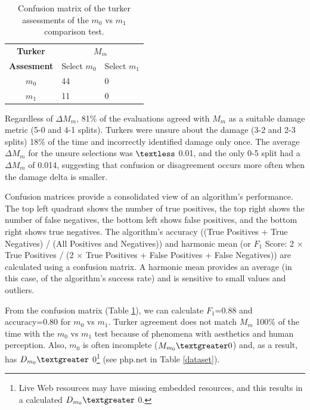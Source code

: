 \begin{table}
\centering\begin{tabular}{cll}
\textbf{Turker} & \multicolumn{2}{c}{ \textbf{ $M_{m}$}}                           \\
\textbf{Assesment}                  &          Select $m_{0}$             &           Select $m_{1}$             \\ \cline{2-3} 
       $m_{0}$           & \multicolumn{1}{|l}{44} & \multicolumn{1}{|l|}{0} \\ \cline{2-3} 
       $m_{1}$           & \multicolumn{1}{|l}{11} & \multicolumn{1}{|l|}{0} \\ \cline{2-3} 
\end{tabular}
 \caption{Confusion matrix of the turker assessments of the $m_0$ vs $m_1$ comparison test.}
  \label{m0cm}
\end{table}


Regardless of {$\Delta M_m$}, 81\% of the evaluations agreed with $M_m$ as a suitable damage metric (5-0 and 4-1 splits). Turkers were unsure about the damage (3-2 and 2-3 splits) 18\% of the time and incorrectly identified damage only once. The average {$\Delta M_m$} for the unsure selections was $\textless$ 0.01, and the only 0-5 split had a {$\Delta M_m$} of 0.014, suggesting that confusion or disagreement occurs more often when the damage delta is smaller. 

Confusion matrices provide a consolidated view of an algorithm's performance. The top left quadrant shows the number of true positives, the top right shows the number of false negatives, the bottom left shows false positives, and the bottom right shows true negatives. The algorithm's accuracy ((True Positives + True Negatives) / (All Positives and Negatives)) and harmonic mean (or $F_1$ Score: 2 $\times$ True Positives / (2 $\times$ True Positives + False Positives + False Negatives)) are calculated using a confusion  matrix. A harmonic mean provides an average (in this case, of the algorithm's success rate) and is sensitive to small values and outliers.  

From the confusion matrix (Table \ref{m0cm}), we can calculate $F_1$=0.88 and accuracy=0.80 for $m_0$ vs $m_1$. Turker agreement does not match $M_m$ 100\% of the time with the $m_0$ vs $m_1$ test because of phenomena with aesthetics and human perception. Also, $m_0$ is often incomplete ($M_{m_0} \textgreater 0$) and, as a result, has $D_{m_0} \textgreater$ 0\footnote{Live Web resources may have missing embedded resources, and this results in a calculated $D_{m_0} \textgreater$ 0.} (see php.net in Table \ref{dataset}).


